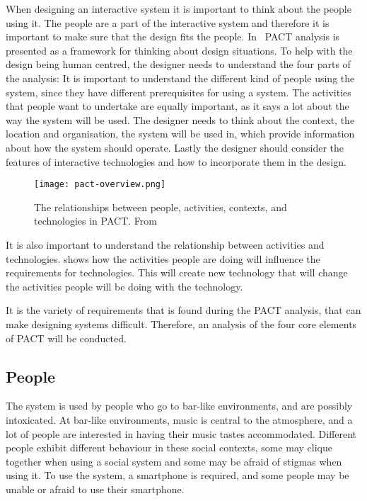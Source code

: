 When designing an interactive system it is important to think about the people using it. The people are a part of the interactive system and therefore it is important to make sure that the design fits the people. In~\cite{benyon2013designing} PACT analysis is presented as a framework for thinking about design situations. To help with the design being human centred, the designer needs to understand the four parts of the analysis: It is important to understand the different kind of people using the system, since they have different prerequisites for using a system. The activities that people want to undertake are equally important, as it says a lot about the way the system will be used. The designer needs to think about the context, the location and organisation, the system will be used in, which provide information about how the system should operate. Lastly the designer should consider the features of interactive technologies and how to incorporate them in the design.

\begin{figure}[hbtp]
  \centering
  \texttt{[image: pact-overview.png]}
  \caption[PACT overview.]{The relationships between people, activities, contexts, and technologies in PACT. From~\cite{benyon2013designing}}
  \label{fig:pact-overview}
\end{figure}

It is also important to understand the relationship between activities and technologies.  shows how the activities people are doing will influence the requirements for technologies. This will create new technology that will change the activities people will be doing with the technology.

It is the variety of requirements that is found during the PACT analysis, that can make designing systems difficult. Therefore, an analysis of the four core elements of PACT will be conducted.


\subsection{People}
\label{sub:pact_people}

The system is used by people who go to bar-like environments, and are possibly intoxicated. At bar-like environments, music is central to the atmosphere, and a lot of people are interested in having their music tastes accommodated. Different people exhibit different behaviour in these social contexts, some may clique together when using a social system and some may be afraid of stigmas when using it. To use the system, a smartphone is required, and some people may be unable or afraid  to use their smartphone.

